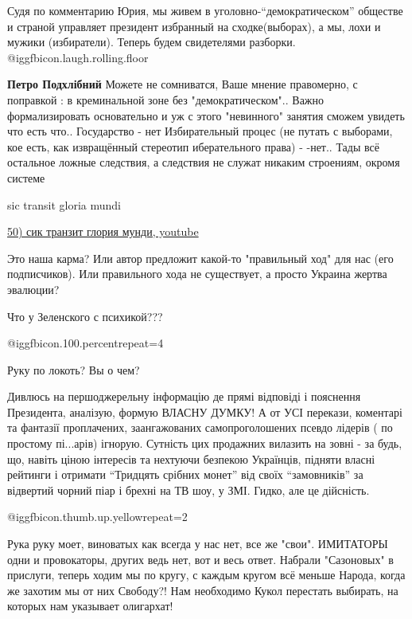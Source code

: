 \begin{itemize}
Судя по комментарию Юрия, мы живем в уголовно-\enquote{демократическом} обществе и
страной управляет президент избранный на сходке(выборах), а мы, лохи и мужики
(избиратели). Теперь будем свидетелями разборки. @igg{fbicon.laugh.rolling.floor} 

\begin{itemize} %
\textbf{Петро Подхлібний}
Можете не сомниватся, Ваше мнение правомерно, с поправкой : в креминальной зоне без "демократическом"..
Важно формализировать основательно и уж с этого "невинного" занятия сможем увидеть что есть что..
Государство - нет
Избирательный процес (не путать с выборами, кое есть, как извращённый стереотип иберательного права) - -нет..
Тады всё остальное ложные следствия, а следствия не служат никаким строениям, окромя системе
\end{itemize} %

sic transit gloria mundi

\href{https://youtu.be/q_9BXMRCQn4}{%
50) сик транзит глория мунди, youtube%
}


Это наша карма? Или автор предложит какой-то "правильный ход" для нас (его
подписчиков). Или правильного хода не существует, а просто Украина жертва
эвалюции?


Что у Зеленского с психикой???

 @igg{fbicon.100.percent}{repeat=4} 

Руку по локоть? Вы о чем?


Дивлюсь на першоджерельну інформацію де прямі відповіді і пояснення
Президента, аналізую, формую ВЛАСНУ ДУМКУ! А от УСІ перекази, коментарі та
фантазії проплачених, заангажованих самопроголошених псевдо лідерів ( по
простому пі...арів) ігнорую. Сутність цих продажних вилазить на зовні - за
будь, що, навіть ціною інтересів та нехтуючи безпекою Українців, підняти власні
рейтинги і отримати \enquote{Тридцять срібних монет} від своїх \enquote{замовників} за
відвертий чорний піар і брехні на ТВ шоу, у ЗМІ. Гидко, але це дійсність.


 @igg{fbicon.thumb.up.yellow}{repeat=2} 


Рука руку моет, виноватых как всегда у нас нет, все же "свои".
ИМИТАТОРЫ одни и провокаторы, других ведь нет, вот и весь ответ.
Набрали "Сазоновых" в прислуги, теперь ходим мы по кругу, с каждым кругом всё меньше Народа, когда же захотим мы от них Свободу?!
Нам необходимо Кукол перестать выбирать, на которых нам указывает олигархат!


\end{itemize}
